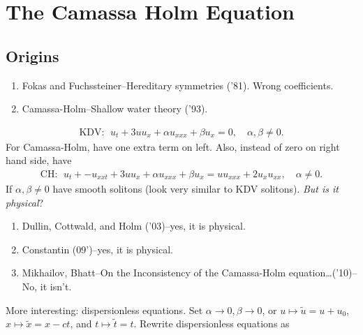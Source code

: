 \documentclass[12pt,reqno]{amsart}
\numberwithin{equation}{section}  %
\begin{document}
        \section{The Camassa Holm Equation}
        \label{sec:ch}
        \subsection{Origins}
\label{ssec:origins}
        \begin{enumerate}
          \item
            Fokas and Fuchssteiner--Hereditary symmetries ('81). Wrong coefficients.
          \item Camassa-Holm--Shallow water theory ('93).
        \end{enumerate}
        
        \begin{equation*}
        \begin{split}
          \text{KDV}: \ \
          u_{t} + 3 uu_{x} + \alpha u_{xxx} + \beta u_{x} = 0, \quad \alpha,
          \beta \neq 0.
        \end{split}
        \end{equation*}
        For Camassa-Holm, have one extra term on left. Also,
        instead of zero on right hand side, have
        \begin{equation*}
        \begin{split}
        \text{CH}: \ \
        u_{t} + - u_{xxt} + 3 uu_{x} + \alpha u_{xxx} + \beta u_{x} = uu_{xxx} + 2
        u_{x} u_{xx}, \quad \alpha \neq 0.
        \end{split}
        \end{equation*}
        If $\alpha, \beta \neq 0$ have smooth solitons (look very similar to KDV
        solitons). \emph{But is it physical}?
        \begin{enumerate}
          \item Dullin, Cottwald, and Holm ('03)--yes, it is physical. 
          \item Constantin (09')--yes, it is physical.
          \item Mikhailov, Bhatt--On the Inconsistency of the Camassa-Holm
            equation\ldots('10)--No, it isn't.
        \end{enumerate}
        More interesting: dispersionless equations. Set $\alpha \to 0, \beta \to
        0$, or $u \mapsto \tilde{u} = u + u_{0}$, $x \mapsto \tilde{x} = x -
        ct$, and $t \mapsto \tilde{t} = t$. Rewrite dispersionless equations as
\end{document}
